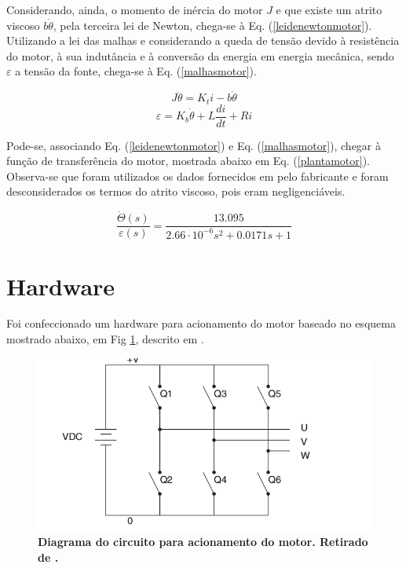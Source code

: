 \documentclass[10pt,fleqn,a4paper]{article}
\begin{document}
    Considerando, ainda, o momento de inércia do motor $J$ e que existe um atrito viscoso $b\dot{\theta}$, pela terceira lei de Newton, chega-se à Eq. (\ref{leidenewtonmotor}). Utilizando a lei das malhas e considerando a queda de tensão devido à resistência do motor, à sua indutância e à conversão da energia em energia mecânica, sendo $\varepsilon$ a tensão da fonte, chega-se à Eq. (\ref{malhasmotor}).
    
    \begin{equation}
    J\ddot{\theta} = K_ti - b\dot{\theta} \label{leidenewtonmotor}
    \end{equation}
    \begin{equation}
    \varepsilon = K_b\dot{\theta} + L\frac{di}{dt} + Ri \label{malhasmotor}
    \end{equation}
    
    Pode-se, associando Eq. (\ref{leidenewtonmotor}) e Eq. (\ref{malhasmotor}), chegar à função de transferência do motor, mostrada abaixo em Eq. (\ref{plantamotor}). Observa-se que foram utilizados os dados fornecidos em \cite{Datasheet} pelo fabricante e foram desconsiderados os termos do atrito viscoso, pois eram negligenciáveis.
    
    \begin{equation}
    \frac{\dot{\Theta}(s)}{\varepsilon(s)} = \frac{13.095}{2.66 \cdot 10^{-6} s^2+0.0171s+1} \label{plantamotor}
    \end{equation}
    
    \section{Hardware}
    
    Foi confeccionado um hardware para acionamento do motor baseado no esquema mostrado abaixo, em Fig \ref{fig:diagrama}, descrito em \cite{atmeldiagrama}. 
    
	\begin{figure}[ht]
		\begin{center}
			\includegraphics[angle=0, scale=0.5]{images/circuitdiagram}
		\end{center}
		\caption{\textbf{Diagrama do circuito para acionamento do motor. Retirado de \cite{atmeldiagrama}.}}
		\label{fig:diagrama}
	\end{figure}
    
\end{document}
